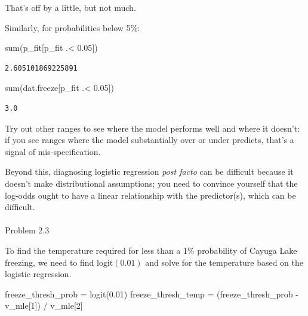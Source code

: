 \documentclass[
  letterpaper,
  DIV=11,
  numbers=noendperiod]{scrartcl}
\makeatletter
\let\oldparagraph\paragraph
\renewcommand{\paragraph}{
    \@ifstar
      \xxxParagraphStar
      \xxxParagraphNoStar
  }
\newcommand{\xxxParagraphStar}[1]{\oldparagraph*{#1}\mbox{}}
\newcommand{\xxxParagraphNoStar}[1]{\oldparagraph{#1}\mbox{}}
\newenvironment{Shaded}{\begin{snugshade}}{\end{snugshade}}
\newcommand{\FloatTok}[1]{\textcolor[rgb]{0.68,0.00,0.00}{#1}}
\newcommand{\FunctionTok}[1]{\textcolor[rgb]{0.28,0.35,0.67}{#1}}
\newcommand{\NormalTok}[1]{\textcolor[rgb]{0.00,0.23,0.31}{#1}}
\newcommand{\OperatorTok}[1]{\textcolor[rgb]{0.37,0.37,0.37}{#1}}
\makeatother
\begin{document}
That's off by a little, but not much.

Similarly, for probabilities below 5\%:

\begin{Shaded}
\begin{Highlighting}[]
\FunctionTok{sum}\NormalTok{(p\_fit[p\_fit }\OperatorTok{.\textless{}} \FloatTok{0.05}\NormalTok{])}
\end{Highlighting}
\end{Shaded}

\begin{verbatim}
2.605101869225891
\end{verbatim}

\begin{Shaded}
\begin{Highlighting}[]
\FunctionTok{sum}\NormalTok{(dat.freeze[p\_fit }\OperatorTok{.\textless{}} \FloatTok{0.05}\NormalTok{])}
\end{Highlighting}
\end{Shaded}

\begin{verbatim}
3.0
\end{verbatim}

Try out other ranges to see where the model performs well and where it
doesn't: if you see ranges where the model substantially over or under
predicts, that's a signal of mis-specification.

Beyond this, diagnosing logistic regression \emph{post facto} can be
difficult because it doesn't make distributional assumptions; you need
to convince yourself that the log-odds ought to have a linear
relationship with the predictor(s), which can be difficult.

\paragraph{Problem 2.3}\label{problem-2.3}

To find the temperature required for less than a 1\% probability of
Cayuga Lake freezing, we need to find \(\text{logit}(0.01)\) and solve
for the temperature based on the logistic regression.

\begin{Shaded}
\begin{Highlighting}[]
\NormalTok{freeze\_thresh\_prob }\OperatorTok{=} \FunctionTok{logit}\NormalTok{(}\FloatTok{0.01}\NormalTok{)}
\NormalTok{freeze\_thresh\_temp }\OperatorTok{=}\NormalTok{ (freeze\_thresh\_prob }\OperatorTok{{-}}\NormalTok{ v\_mle[}\FloatTok{1}\NormalTok{]) }\OperatorTok{/}\NormalTok{ v\_mle[}\FloatTok{2}\NormalTok{]}
\end{Highlighting}
\end{Shaded}
\end{document}
